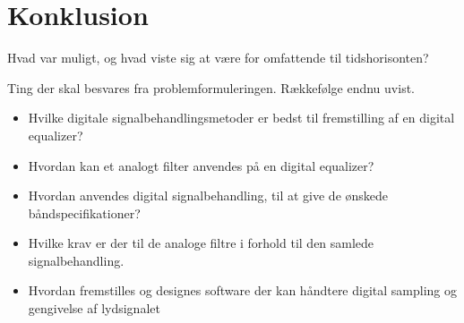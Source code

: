 \chapter{Konklusion} \label{kap:konklusion}

Hvad var muligt, og hvad viste sig at være for omfattende til tidshorisonten?

Ting der skal besvares fra problemformuleringen. Rækkefølge endnu uvist.
\begin{itemize}[noitemsep]
	\item Hvilke digitale signalbehandlingsmetoder er bedst til fremstilling af en digital equalizer?
	\item Hvordan kan et analogt filter anvendes på en digital equalizer?
	\item Hvordan anvendes digital signalbehandling, til at give de ønskede båndspecifikationer?
	\item Hvilke krav er der til de analoge filtre i forhold til den samlede signalbehandling.
	\item Hvordan fremstilles og designes software der kan håndtere digital sampling og gengivelse af lydsignalet
\end{itemize}

